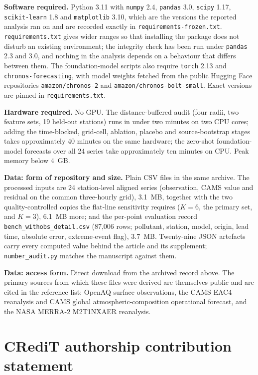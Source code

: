\documentclass[review,times,authoryear]{elsarticle}
\begin{document}
\noindent\textbf{Software required.} Python 3.11 with \texttt{numpy} 2.4,
\texttt{pandas} 3.0, \texttt{scipy} 1.17, \texttt{scikit-learn} 1.8 and
\texttt{matplotlib} 3.10, which are the versions the reported analysis ran on and are
recorded exactly in \texttt{requirements-frozen.txt}. \texttt{requirements.txt} gives
wider ranges so that installing the package does not disturb an existing environment; the
integrity check has been run under \texttt{pandas} 2.3 and 3.0, and nothing in the
analysis depends on a behaviour that differs between them. The foundation-model
scripts also require \texttt{torch} 2.13 and \texttt{chronos-forecasting}, with
model weights fetched from the public Hugging Face repositories
\texttt{amazon/chronos-2} and \texttt{amazon/chronos-bolt-small}. Exact versions are
pinned in \texttt{requirements.txt}.

\noindent\textbf{Hardware required.} No GPU. The distance-buffered audit (four radii,
two feature sets, 19 held-out stations) runs in under two minutes on two CPU cores; adding the
time-blocked, grid-cell, ablation, placebo and source-bootstrap stages takes approximately
40 minutes on the same hardware; the
zero-shot foundation-model forecasts over all 24 series take approximately ten minutes on
CPU. Peak memory below 4~GB.

\noindent\textbf{Data: form of repository and size.} Plain CSV files in the same archive.
The processed inputs are 24 station-level aligned series (observation, CAMS value and
residual on the common three-hourly grid), 3.1~MB, together with the two quality-controlled
copies the flat-line sensitivity requires ($K=6$, the primary set, and $K=3$), 6.1~MB more;
and the per-point evaluation record \texttt{bench\_withobs\_detail.csv} (87{,}006 rows;
pollutant, station, model, origin, lead time, absolute error, extreme-event flag), 3.7~MB.
Twenty-nine JSON artefacts carry every computed value behind the article and its
supplement; \texttt{number\_audit.py} matches the manuscript against them.

\noindent\textbf{Data: access form.} Direct download from the archived record above.
The primary sources from which these files were derived are themselves public and are
cited in the reference list: OpenAQ surface observations, the CAMS EAC4 reanalysis and
CAMS global atmospheric-composition operational forecast, and the NASA MERRA-2
M2T1NXAER reanalysis.

\section*{CRediT authorship contribution statement}
\end{document}
